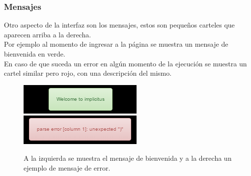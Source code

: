 \documentclass[12pt]{article}
\begin{document}
\subsubsection{Mensajes}
Otro aspecto de la interfaz son los mensajes, estos son pequeños carteles que aparecen arriba a la derecha.
\\Por ejemplo al momento de ingresar a la página se muestra un mensaje de bienvenida en verde.
\\En caso de que suceda un error en algún momento de la ejecución se muestra un cartel similar pero  rojo, con una descripción del mismo.
\begin{figure}[h!]
\includegraphics[width =0.45\linewidth]{welcome.png}
\hfill
\includegraphics[width =0.45\linewidth]{error.png}
\caption{A la izquierda se muestra el mensaje de bienvenida y a la derecha un ejemplo de mensaje de error.}
\label{ fig : surface }
\end{figure}
\end{document}
